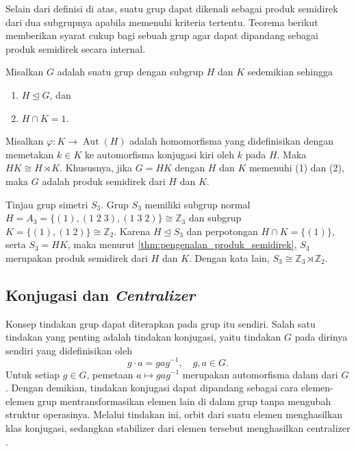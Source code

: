 Selain dari definisi di atas, suatu grup dapat dikenali sebagai produk semidirek dari dua subgrupnya apabila memenuhi kriteria tertentu. Teorema berikut memberikan syarat cukup bagi sebuah grup agar dapat dipandang sebagai produk semidirek secara internal.

\begin{teorema}\label{thm:pengenalan_produk_semidirek}
  Misalkan $G$ adalah suatu grup dengan subgrup $H$ dan $K$ sedemikian sehingga
  \begin{enumerate}[label=(\arabic*)]
    \item $H \unlhd G$, dan
    \item $H \cap K = 1$.
  \end{enumerate}
  Misalkan $\varphi : K \to \operatorname{Aut}(H)$ adalah homomorfisma yang didefinisikan dengan memetakan $k \in K$ ke automorfisma konjugasi kiri oleh $k$ pada $H$. Maka $HK \cong H \rtimes K$. Khususnya, jika $G = HK$ dengan $H$ dan $K$ memenuhi (1) dan (2), maka $G$ adalah produk semidirek dari $H$ dan $K$.
\end{teorema}

\begin{contoh}
  Tinjau grup simetri $S_3$. Grup $S_3$ memiliki subgrup normal $H = A_3 = \{(1), (1\;2\;3), (1\;3\;2)\} \cong \mathbb{Z}_3$ dan subgrup $K = \{(1), (1\;2)\} \cong \mathbb{Z}_2$. Karena $H \unlhd S_3$ dan perpotongan $H \cap K = \{(1)\}$, serta $S_3 = HK$, maka menurut \autoref{thm:pengenalan_produk_semidirek}, $S_3$ merupakan produk semidirek dari $H$ dan $K$. Dengan kata lain, $S_3 \cong \mathbb{Z}_3 \rtimes \mathbb{Z}_2$.
\end{contoh}

\subsection{Konjugasi dan \emph{Centralizer}}

Konsep tindakan grup dapat diterapkan pada grup itu sendiri. Salah satu tindakan yang penting adalah tindakan konjugasi, yaitu tindakan $G$ pada dirinya sendiri yang didefinisikan oleh
\[
  g\cdot a = gag^{-1},
  \quad g,a\in G.
\]
Untuk setiap $g\in G$, pemetaan
$
  a\mapsto gag^{-1}
$
merupakan automorfisma dalam dari $G$. Dengan demikian, tindakan konjugasi dapat dipandang sebagai cara elemen-elemen grup mentransformasikan elemen lain di dalam grup tanpa mengubah struktur operasinya. Melalui tindakan ini, orbit dari suatu elemen menghasilkan klas konjugasi, sedangkan stabilizer dari elemen tersebut menghasilkan centralizer \citep{subiono2022aljabar}.

